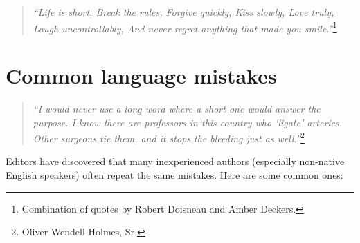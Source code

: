 \documentclass[graybox,envcountchap,sectrefs,UStrade]{svmono}
\begin{document}
\begin{quote}
\emph{``Life is short, Break the rules, Forgive quickly, Kiss slowly, Love truly, Laugh uncontrollably, And never regret anything that made you smile.''}\footnote{Combination of quotes by Robert Doisneau and Amber Deckers.}
\end{quote}



 \section{Common language mistakes}

\begin{quote}
    \emph{``I would never use a long word where a short one would answer the purpose. I know there are professors in this country who `ligate' arteries. Other surgeons tie them, and it stops the bleeding just as well.''}\footnote{Oliver Wendell Holmes, Sr.}
\end{quote}

Editors have discovered that many inexperienced authors (especially non-native English speakers) often repeat the same mistakes. Here are some common ones:
\end{document}
